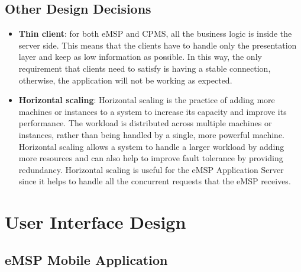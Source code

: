 \documentclass{Configuration_Files/PoliMi3i_thesis}
\begin{document}
\section{Other Design Decisions}

\begin{itemize}
    \item \textbf{Thin client}: for both eMSP and CPMS, all the business logic is inside the server side. This means that the clients have to handle only the presentation layer and keep as low information as possible. In this way, the only requirement that clients need to satisfy is having a stable connection, otherwise, the application will not be working as expected.
    \item \textbf{Horizontal scaling}: Horizontal scaling is the practice of adding more machines or instances to a system to increase its capacity and improve its performance. The workload is distributed across multiple machines or instances, rather than being handled by a single, more powerful machine. Horizontal scaling allows a system to handle a larger workload by adding more resources and can also help to improve fault tolerance by providing redundancy. Horizontal scaling is useful for the eMSP Application Server since it helps to handle all the concurrent requests that the eMSP receives.
\end{itemize}

\chapter{User Interface Design}

\section{eMSP Mobile Application}
\end{document}
